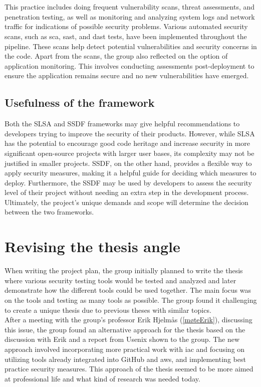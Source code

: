 \\~\\
This practice includes doing frequent vulnerability scans, threat assessments, and penetration testing, as well as monitoring and analyzing system logs and network traffic for indications of possible security problems. Various automated security scans, such as \acrshort{sca}, \acrshort{sast}, and \acrshort{dast} tests, have been implemented throughout the pipeline. These scans help detect potential vulnerabilities and security concerns in the code. Apart from the scans, the group also reflected on the option of application monitoring. This involves conducting assessments post-deployment to ensure the application remains secure and no new vulnerabilities have emerged.

\subsection{Usefulness of the framework}

Both the SLSA and SSDF frameworks may give helpful recommendations to developers trying to improve the security of their products. However, while SLSA has the potential to encourage good code heritage and increase security in more significant open-source projects with larger user bases, its complexity may not be justified in smaller projects. SSDF, on the other hand, provides a flexible way to apply security measures, making it a helpful guide for deciding which measures to deploy. Furthermore, the SSDF may be used by developers to assess the security level of their project without needing an extra step in the development process. Ultimately, the project's unique demands and scope will determine the decision between the two frameworks.

\section{Revising the thesis angle}
When writing the project plan, the group initially planned to write the thesis where various security testing tools would be tested and analyzed and later demonstrate how the different tools could be used together. The main focus was on the tools and testing as many tools as possible. The group found it challenging to create a unique thesis due to previous theses with similar topics. 
\\
After a meeting with the group's professor Erik Hjelmås  (\ref{møteErik}), discussing this issue, the group found an alternative approach for the thesis based on the discussion with Erik and a report from Usenix \cite{usenixreport} shown to the group. The new approach involved incorporating more practical work with \gls{iac} and focusing on utilizing tools already integrated into GitHub and \acrshort{aws}, and implementing best practice security measures. This approach of the thesis seemed to be more aimed at professional life and what kind of research was needed today.  


